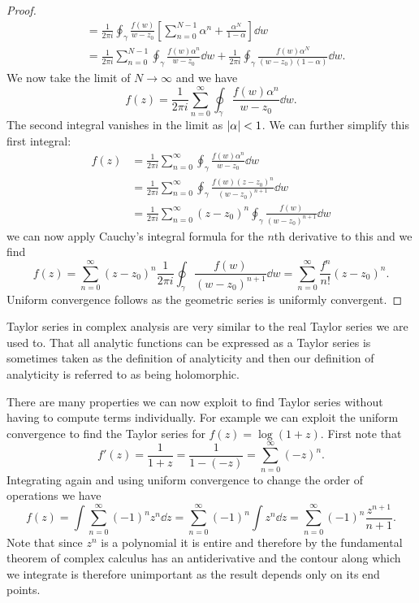 \documentclass{article}
\begin{document}
\begin{proof}
\begin{align*}
            &= \frac{1}{2\pi i} \oint_{\gamma} \frac{f(w)}{w - z_0} \left[\sum_{n=0}^{N - 1}\alpha^n + \frac{\alpha^N}{1 - \alpha}\right]\dd{w}\\
            &= \frac{1}{2\pi i} \sum_{n=0}^{N-1} \oint_{\gamma} \frac{f(w)\alpha^n}{w - z_0}\dd{w} + \frac{1}{2\pi i}\oint_{\gamma} \frac{f(w)\alpha^N}{(w - z_0)(1 - \alpha)}\dd{w}.
        \end{align*}
        We now take the limit of \(N \to \infty\) and we have
        \[f(z) = \frac{1}{2\pi i} \sum_{n=0}^{\infty} \oint_{\gamma} \frac{f(w)\alpha^n}{w - z_0}\dd{w}.\]
        The second integral vanishes in the limit as \(\abs{\alpha} < 1\).
        We can further simplify this first integral:
        \begin{align*}
            f(z) &= \frac{1}{2\pi i} \sum_{n=0}^{\infty} \oint_{\gamma} \frac{f(w)\alpha^n}{w - z_0}\dd{w}\\
            &= \frac{1}{2\pi i} \sum_{n=0}^{\infty} \oint_{\gamma} \frac{f(w)(z - z_0)^n}{(w - z_0)^{n+1}}\dd{w}\\
            &= \frac{1}{2\pi i} \sum_{n=0}^{\infty} (z - z_0)^n \oint_{\gamma} \frac{f(w)}{(w - z_0)^{n+1}}\dd{w}
        \end{align*}
        we can now apply Cauchy's integral formula for the \(n\)th derivative to this and we find
        \[f(z) = \sum_{n=0}^{\infty} (z - z_0)^n \frac{1}{2\pi i}\oint_{\gamma} \frac{f(w)}{(w - z_0)^{n+1}}\dd{w} = \sum_{n=0}^{\infty} \frac{f^{n}}{n!}(z - z_0)^n.\]
        Uniform convergence follows as the geometric series is uniformly convergent.
    \end{proof}
    Taylor series in complex analysis are very similar to the real Taylor series we are used to.
    That all analytic functions can be expressed as a Taylor series is sometimes taken as the definition of analyticity and then our definition of analyticity is referred to as being holomorphic.
    
    There are many properties we can now exploit to find Taylor series without having to compute terms individually.
    For example we can exploit the uniform convergence to find the Taylor series for \(f(z) = \log(1 + z)\).
    First note that
    \[f'(z) = \frac{1}{1 + z} = \frac{1}{1 - (-z)} = \sum_{n=0}^{\infty}(-z)^n.\]
    Integrating again and using uniform convergence to change the order of operations we have
    \[f(z) = \int \sum_{n=0}^{\infty} (-1)^nz^n\dd{z} = \sum_{n=0}^{\infty} (-1)^n \int z^n \dd{z} = \sum_{n=0}^{\infty} (-1)^n \frac{z^{n+1}}{n + 1}.\]
    Note that since \(z^n\) is a polynomial it is entire and therefore by the fundamental theorem of complex calculus has an antiderivative and the contour along which we integrate is therefore unimportant as the result depends only on its end points.
    
\end{document}
